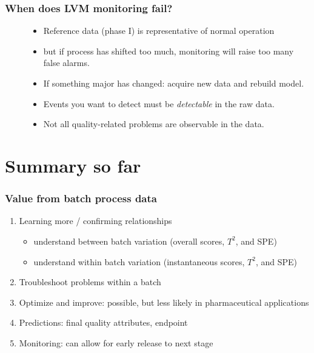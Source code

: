 \documentclass[handout, 12pt]{beamer}
\begin{document}
\begin{frame}\frametitle{When does LVM monitoring fail?}

\begin{description} 
	
	\item[] 
	
		\begin{itemize}
			\item	Reference data (phase I) is representative of normal operation
			
			\item	but if process has shifted too much, monitoring will raise too many false alarms.
			
			\item	If something major has changed: acquire new data and rebuild model.
		\end{itemize}
		
	\item[] 
	
		\begin{itemize}
			\item Events you want to detect must be \emph{detectable} in the raw data.
		
			\item	Not all quality-related problems are observable in the data.
		\end{itemize}
		
\end{description}
\end{frame}

\section{Summary so far}

\begin{frame}\frametitle{Value from batch process data}
\begin{enumerate}
	\item 	Learning more / confirming relationships
		
			\begin{itemize}
				\item 	understand between batch variation (overall scores, \( T^2 \), and SPE)
				\item 	understand within batch variation (instantaneous scores, \( T^2 \), and SPE)
			\end{itemize}
			
	\item 	Troubleshoot problems within a batch
	\item 	Optimize and improve: possible, but less likely in pharmaceutical applications
	\item 	Predictions: final quality attributes, endpoint
	\item 	Monitoring: can allow for early release to next stage
	
\end{enumerate}
\end{frame}
\end{document}
